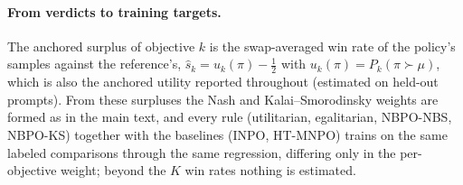 \documentclass[letterpaper]{article} %
\begin{document}
\paragraph{From verdicts to training targets.}
The anchored surplus of objective $k$ is the swap-averaged win rate of the policy's samples against the reference's, $\hat s_k=u_k(\pi)-\tfrac12$ with $u_k(\pi)=P_k(\pi\succ\mu)$, which is also the anchored utility reported throughout (estimated on held-out prompts). From these surpluses the Nash and Kalai--Smorodinsky weights are formed as in the main text, and every rule (utilitarian, egalitarian, NBPO-NBS, NBPO-KS) together with the baselines (INPO, HT-MNPO) trains on the same labeled comparisons through the same regression, differing only in the per-objective weight; beyond the $K$ win rates nothing is estimated.
\end{document}
